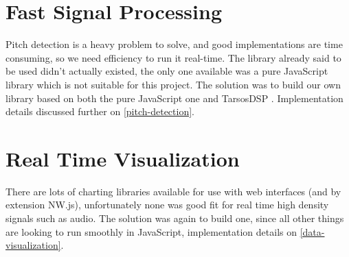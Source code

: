 \section{Fast Signal Processing}
Pitch detection is a heavy problem to solve, and good implementations are time
consuming, so we need efficiency to run it real-time. The library already said
to be used didn't actually existed, the only one available was a pure JavaScript
library \cite{pitchfinder} which is not suitable for this project. The solution
was to build our own library based on both the pure JavaScript one and TarsosDSP
\cite{TarsosDSP}. Implementation details discussed further on \autoref{pitch-detection}.

\section{Real Time Visualization}
There are lots of charting libraries available for use with web interfaces (and
by extension NW.js), unfortunately none was good fit for real time high density
signals such as audio. The solution was again to build one, since all other things
are looking to run smoothly in JavaScript, implementation details on \autoref{data-visualization}.
